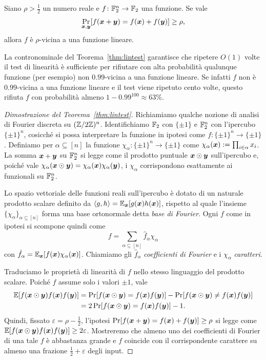 \begin{theorem} \label{thm:lintest}
	Siano $\rho > \frac12$ un numero reale e $f\colon \mathbb{F}_2^n \to \mathbb{F}_2$ una
	funzione. Se vale
	\[
		\Pr_{\bm{x}, \bm{y}}
		[f(\bm{x} + \bm{y}) = f(\bm{x}) + f(\bm{y})] \ge \rho,
	\]
	allora $f$ è $\rho$-vicina a una funzione lineare.
\end{theorem}

La contronominale del Teorema~\ref{thm:lintest} garantisce che ripetere $O(1)$
volte il test di linearità è sufficiente per rifiutare con alta probabilità
qualunque funzione (per esempio) non $0.99$-vicina a una funzione lineare.
Se infatti $f$ non è $0.99$-vicina a una funzione lineare e il test viene
ripetuto cento volte, questo rifiuta $f$ con probabilità almeno
$1 - 0.99^{100} \approx 63\%$.

\begin{proof}[Dimostrazione del Teorema~\ref{thm:lintest}]
	Richiamiamo qualche nozione di analisi di Fourier discreta su
	$(\mathbb{Z}/2\mathbb{Z})^n$.
	Identifichiamo $\mathbb{F}_2$ con $\{\pm 1\}$ e $\mathbb{F}_2^n$ con l'ipercubo
	$\{\pm 1\}^n$, cosicché si possa interpretare la funzione in ipotesi come
	$f\colon \{\pm 1\}^n \to \{\pm 1\}$.
	Definiamo per $\alpha \subseteq [n]$ la funzione
	$\chi_\alpha\colon \{\pm 1\}^n \to \{\pm 1\}$
	come $\chi_\alpha(\bm{x}) := \prod_{i \in \alpha} x_i$.
	La somma $\bm{x} + \bm{y}$ su $\mathbb{F}_2^n$ si legge come il prodotto
	puntuale $\bm{x} \odot \bm{y}$ sull'ipercubo e, poiché vale
	$\chi_\alpha(\bm{x} \odot \bm{y}) = \chi_\alpha(\bm{x}) \chi_\alpha(\bm{y})$, i
	$\chi_\alpha$ corrispondono esattamente ai funzionali su $\mathbb{F}_2^n$.

	Lo spazio vettoriale delle funzioni reali sull'ipercubo è dotato di un
	naturale prodotto scalare definito da $\langle g, h\rangle =
	\mathbb{E}_{\bm{x}}[g(\bm{x}) h(\bm{x})]$, rispetto al quale	l'insieme
	$\{\chi_\alpha\}_{\alpha \subseteq [n]}$ forma una base ortonormale detta
	\emph{base di Fourier}.
	Ogni $f$ come in ipotesi si scompone quindi come
	\[
		f = \sum_{\alpha \subseteq [n]} \hat{f}_\alpha \chi_\alpha
	\]
	con $\hat{f}_\alpha = \mathbb{E}_{\bm{x}}[f(\bm{x}) \chi_\alpha (\bm{x})]$.
	Chiamiamo gli $\hat{f}_\alpha$ \emph{coefficienti di Fourier} e i
	$\chi_\alpha$ \emph{caratteri}.

	Traduciamo le proprietà di linearità di $f$ nello stesso linguaggio del
	prodotto scalare. Poiché $f$ assume solo i valori $\pm 1$, vale
	\begin{align*}
		\mathbb{E}[f(\bm{x} \odot \bm{y})f(\bm{x})f(\bm{y})] &=
			\Pr[f(\bm{x} \odot \bm{y}) = f(\bm{x}) f(\bm{y})]
				- \Pr[f(\bm{x} \odot \bm{y}) \neq f(\bm{x}) f(\bm{y})] \\
			&= 2 \Pr[f(\bm{x} \odot \bm{y}) = f(\bm{x}) f(\bm{y})] - 1.
	\end{align*}
	Quindi, fissato $\varepsilon = \rho - \frac12$, l'ipotesi
	$\Pr[f(\bm{x} + \bm{y}) = f(\bm{x}) + f(\bm{y})] \ge \rho$ si legge come
	$\mathbb{E}[f(\bm{x} \odot \bm{y})f(\bm{x})f(\bm{y})] \ge 2 \varepsilon$.
 	Mostreremo che almeno uno dei coefficienti di Fourier di una tale $f$ è
	abbastanza grande e $f$ coincide con il corrispondente carattere su
	almeno una frazione $\frac12 + \varepsilon$ degli input.


\end{proof}

